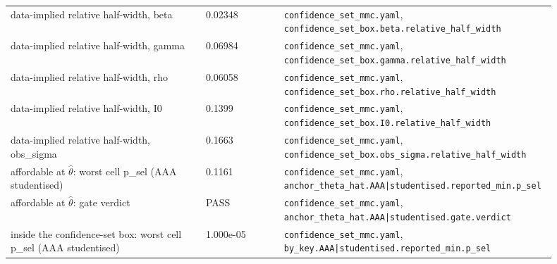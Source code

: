 \begin{longtable}{p{0.35\linewidth} p{0.14\linewidth} p{0.41\linewidth}}
data-implied relative half-width, beta & 0.02348 & \texttt{\footnotesize confidence\_\allowbreak{}set\_\allowbreak{}mmc.\allowbreak{}yaml}, \texttt{\footnotesize confidence\_\allowbreak{}set\_\allowbreak{}box.\allowbreak{}beta.\allowbreak{}relative\_\allowbreak{}half\_\allowbreak{}width} \\
data-implied relative half-width, gamma & 0.06984 & \texttt{\footnotesize confidence\_\allowbreak{}set\_\allowbreak{}mmc.\allowbreak{}yaml}, \texttt{\footnotesize confidence\_\allowbreak{}set\_\allowbreak{}box.\allowbreak{}gamma.\allowbreak{}relative\_\allowbreak{}half\_\allowbreak{}width} \\
data-implied relative half-width, rho & 0.06058 & \texttt{\footnotesize confidence\_\allowbreak{}set\_\allowbreak{}mmc.\allowbreak{}yaml}, \texttt{\footnotesize confidence\_\allowbreak{}set\_\allowbreak{}box.\allowbreak{}rho.\allowbreak{}relative\_\allowbreak{}half\_\allowbreak{}width} \\
data-implied relative half-width, I0 & 0.1399 & \texttt{\footnotesize confidence\_\allowbreak{}set\_\allowbreak{}mmc.\allowbreak{}yaml}, \texttt{\footnotesize confidence\_\allowbreak{}set\_\allowbreak{}box.\allowbreak{}I0.\allowbreak{}relative\_\allowbreak{}half\_\allowbreak{}width} \\
data-implied relative half-width, obs\_sigma & 0.1663 & \texttt{\footnotesize confidence\_\allowbreak{}set\_\allowbreak{}mmc.\allowbreak{}yaml}, \texttt{\footnotesize confidence\_\allowbreak{}set\_\allowbreak{}box.\allowbreak{}obs\_\allowbreak{}sigma.\allowbreak{}relative\_\allowbreak{}half\_\allowbreak{}width} \\
affordable at $\hat{\theta}$: worst cell p\_sel (AAA studentised) & 0.1161 & \texttt{\footnotesize confidence\_\allowbreak{}set\_\allowbreak{}mmc.\allowbreak{}yaml}, \texttt{\footnotesize anchor\_\allowbreak{}theta\_\allowbreak{}hat.\allowbreak{}AAA|\allowbreak{}studentised.\allowbreak{}reported\_\allowbreak{}min.\allowbreak{}p\_\allowbreak{}sel} \\
affordable at $\hat{\theta}$: gate verdict & PASS & \texttt{\footnotesize confidence\_\allowbreak{}set\_\allowbreak{}mmc.\allowbreak{}yaml}, \texttt{\footnotesize anchor\_\allowbreak{}theta\_\allowbreak{}hat.\allowbreak{}AAA|\allowbreak{}studentised.\allowbreak{}gate.\allowbreak{}verdict} \\
inside the confidence-set box: worst cell p\_sel (AAA studentised) & 1.000e-05 & \texttt{\footnotesize confidence\_\allowbreak{}set\_\allowbreak{}mmc.\allowbreak{}yaml}, \texttt{\footnotesize by\_\allowbreak{}key.\allowbreak{}AAA|\allowbreak{}studentised.\allowbreak{}reported\_\allowbreak{}min.\allowbreak{}p\_\allowbreak{}sel} \\

\end{longtable}
